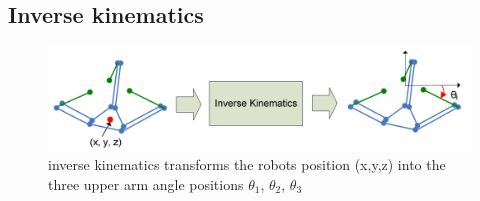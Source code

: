 \subsection{Inverse kinematics}
\begin{figure}[H]
	\centering
	\includegraphics[width=\maxwidth{15cm}, keepaspectratio]{Chapters/Fig/inverse_kinematics.png}
	\caption{inverse kinematics transforms the robots position (x,y,z) into the three upper arm angle positions $\theta_{1}$, $\theta_{2}$, $\theta_{3}$}
	\label{fig:inverse_kinematics}
\end{figure}
